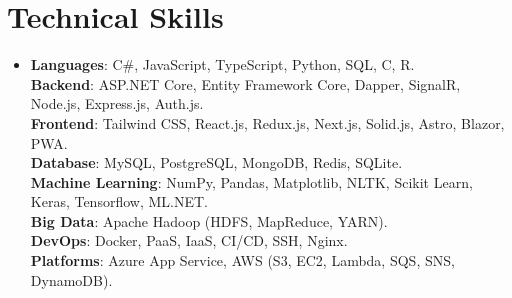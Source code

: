 \documentclass[11pt,a4paper]{article}
\begin{document}
\section{Technical Skills}
 \begin{itemize}[leftmargin=0in, label={}]
    \item{
     \textbf{Languages}{: C\#, JavaScript, TypeScript, Python, SQL, C, R.} \\
     \textbf{Backend}{: ASP.NET Core, Entity Framework Core, Dapper, SignalR, Node.js, Express.js, Auth.js.} \\
     \textbf{Frontend}{: Tailwind CSS, React.js, Redux.js, Next.js, Solid.js, Astro, Blazor, PWA.} \\
     \textbf{Database}{: MySQL, PostgreSQL, MongoDB, Redis, SQLite.} \\
     \textbf{Machine Learning}{: NumPy, Pandas, Matplotlib, NLTK, Scikit Learn, Keras, Tensorflow, ML.NET.} \\
     \textbf{Big Data}{: Apache Hadoop (HDFS, MapReduce, YARN).} \\
     \textbf{DevOps}{: Docker, PaaS, IaaS, CI/CD, SSH, Nginx.} \\
     \textbf{Platforms}{: Azure App Service, AWS (S3, EC2, Lambda, SQS, SNS, DynamoDB).} \\
    }
 \end{itemize}
 \vspace{-16pt}

\end{document}
